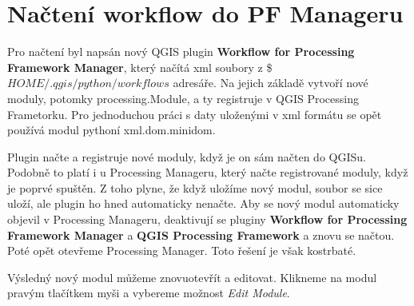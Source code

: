 \newpage
\section{Načtení workflow do PF Manageru}
Pro načtení byl napsán nový QGIS plugin \textbf{Workflow for
Processing Framework Manager}, který načítá xml soubory
z \$$HOME/.qgis/python/workflows$ adresáře. Na jejich základě vytvoří
nové moduly, potomky processing.Module, a ty registruje v QGIS
Processing Frametorku. Pro jednoduchou práci s daty uloženými v xml
formátu se opět používá modul pythoní xml.dom.minidom.

Plugin načte a registruje nové moduly, když je on sám načten do
QGISu. Podobně to platí i u Processing Manageru, který načte
registrované moduly, když je poprvé spuštěn. Z toho plyne, že když
uložíme nový modul, soubor se sice uloží, ale plugin ho hned
automaticky nenačte. Aby se nový modul automaticky objevil v
Processing Manageru, deaktivují se pluginy \textbf{Workflow for
Processing Framework Manager} a \textbf{QGIS Processing Framework} a
znovu se načtou. Poté opět otevřeme Processing Manager. Toto řešení je
však kostrbaté.

Výsledný nový modul můžeme znovuotevřít a editovat. Klikneme na modul
pravým tlačítkem myši a vybereme možnost \textit{Edit Module}.
